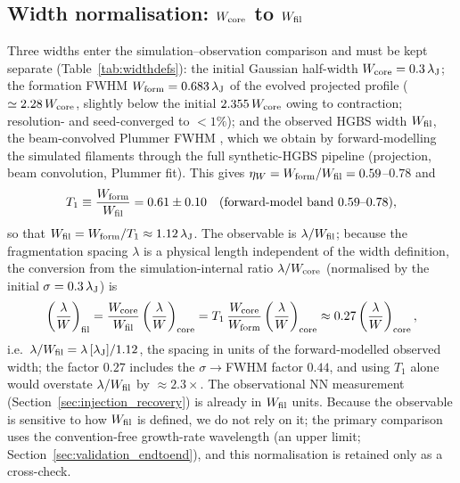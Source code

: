 \documentclass[usenatbib,twoside,twocolumn]{mnras}
\begin{document}
\subsection{Width normalisation: $W_{\rm core}$ to $W_{\rm fil}$}
\label{sec:width_correction}
Three widths enter the simulation--observation comparison and must be kept separate (Table~\ref{tab:widthdefs}): the initial Gaussian half-width $W_{\rm core}=0.3\,\lambda_{\rm J}$; the formation FWHM $W_{\rm form}=0.683\,\lambda_{\rm J}$ of the evolved projected profile ($\simeq2.28\,W_{\rm core}$, slightly below the initial $2.355\,W_{\rm core}$ owing to contraction; resolution- and seed-converged to $<1\%$); and the observed HGBS width $W_{\rm fil}$, the beam-convolved Plummer FWHM \citep{Arzoumanian2019}, which we obtain by forward-modelling the simulated filaments through the full synthetic-HGBS pipeline (projection, beam convolution, Plummer fit). This gives $\eta_W=W_{\rm form}/W_{\rm fil}=0.59$--$0.78$ and
\begin{equation}
T_1 \equiv \frac{W_{\rm form}}{W_{\rm fil}} = 0.61 \pm 0.10 \quad (\text{forward-model band } 0.59\text{--}0.78),
\label{eq:t1_correction}
\end{equation}
so that $W_{\rm fil}=W_{\rm form}/T_1\approx1.12\,\lambda_{\rm J}$. The observable is $\lambda/W_{\rm fil}$; because the fragmentation spacing $\lambda$ is a physical length independent of the width definition, the conversion from the simulation-internal ratio $\lambda/W_{\rm core}$ (normalised by the initial $\sigma=0.3\,\lambda_{\rm J}$) is
\begin{equation}
\left(\frac{\lambda}{W}\right)_{\rm fil} = \frac{W_{\rm core}}{W_{\rm fil}}\left(\frac{\lambda}{W}\right)_{\rm core} = T_1\,\frac{W_{\rm core}}{W_{\rm form}}\left(\frac{\lambda}{W}\right)_{\rm core} \approx 0.27\left(\frac{\lambda}{W}\right)_{\rm core},
\label{eq:t1_apply}
\end{equation}
i.e.\ $\lambda/W_{\rm fil}=\lambda\,[\lambda_{\rm J}]/1.12$, the spacing in units of the forward-modelled observed width; the factor $0.27$ includes the $\sigma\!\to\!$FWHM factor $0.44$, and using $T_1$ alone would overstate $\lambda/W_{\rm fil}$ by $\approx2.3\times$. The observational NN measurement (Section~\ref{sec:injection_recovery}) is already in $W_{\rm fil}$ units. Because the observable is sensitive to how $W_{\rm fil}$ is defined, we do not rely on it; the primary comparison uses the convention-free growth-rate wavelength (an upper limit; Section~\ref{sec:validation_endtoend}), and this normalisation is retained only as a cross-check.
\end{document}
